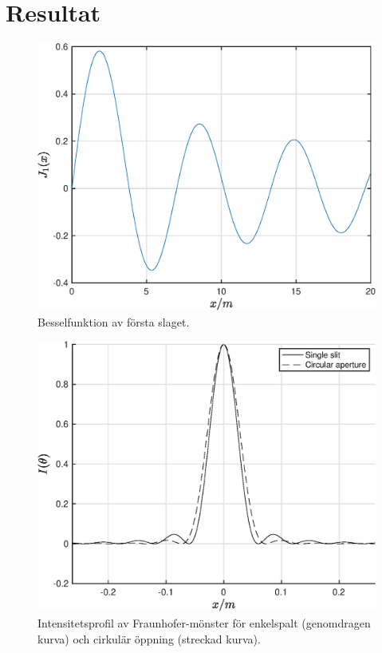 \section{Resultat}

\begin{figure}[H]
    \centering
    \captionsetup{justification=centering,margin=2cm}
    \includegraphics[scale=0.5]{Resources/Graphics/fig5_1.eps}
    \caption{Besselfunktion av första slaget.}
    \label{fig:5_1}
\end{figure}



\begin{figure}[H]
    \centering
    \captionsetup{justification=centering,margin=2cm}
    \includegraphics[scale=0.5]{Resources/Graphics/fig5_2.eps}
    \caption{Intensitetsprofil av Fraunhofer-mönster för enkelspalt (genomdragen kurva) och cirkulär öppning (streckad kurva).}
    \label{fig:5_2}
\end{figure}

